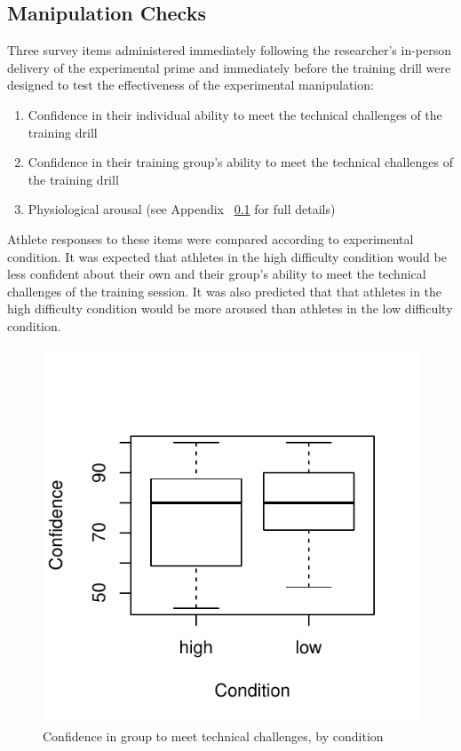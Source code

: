 \subsection{Manipulation Checks}
Three survey items administered immediately following the researcher's in-person delivery of the experimental prime and immediately before the training drill were designed to test the effectiveness of the experimental manipulation:

\begin{enumerate}
  \item Confidence in their individual ability to meet the technical challenges of the training drill
  \item Confidence in their training group's ability to meet the technical challenges of the training drill
  \item Physiological arousal (see Appendix ~\ref{} for full details)
\end{enumerate}

Athlete responses to these items were compared according to experimental condition. It was expected that athletes in the high difficulty condition would be less confident about their own and their group's ability to meet the technical challenges of the training session.  It was also predicted that that athletes in the high difficulty condition would be more aroused than athletes in the low difficulty condition.


\begin{figure}
  \centering
   \includegraphics[width=0.5\linewidth,keepaspectratio] {images/groupConfChallengesBoxplot-1}
  \caption{Confidence in group to meet technical challenges, by condition}
  \label{fig:groupConfChallengesBoxplot}
\end{figure}

